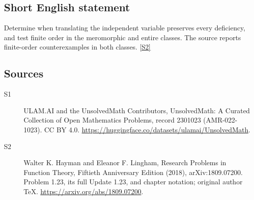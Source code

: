\documentclass[11pt]{article}
\newcommand{\sref}[2]{\hyperlink{source:#1:#2}{[S#2]}}
\begin{document}
\subsection{Short English statement}
Determine when translating the independent variable preserves every deficiency, and test finite order in the meromorphic and entire classes. The source reports finite-order counterexamples in both classes. \sref{2301023}{2}
\subsection{Sources}
\begin{description}
\item[\hypertarget{source:2301023:1}{S1}] ULAM.AI and the UnsolvedMath Contributors, UnsolvedMath: A Curated Collection of Open Mathematics Problems, record 2301023 (AMR-022-1023). CC BY 4.0. \url{https://huggingface.co/datasets/ulamai/UnsolvedMath}.
\item[\hypertarget{source:2301023:2}{S2}] Walter K. Hayman and Eleanor F. Lingham, Research Problems in Function Theory, Fiftieth Anniversary Edition (2018), arXiv:1809.07200. Problem 1.23, its full Update 1.23, and chapter notation; original author TeX. \url{https://arxiv.org/abs/1809.07200}.
\end{description}
\label{end:2301023}
\end{document}

